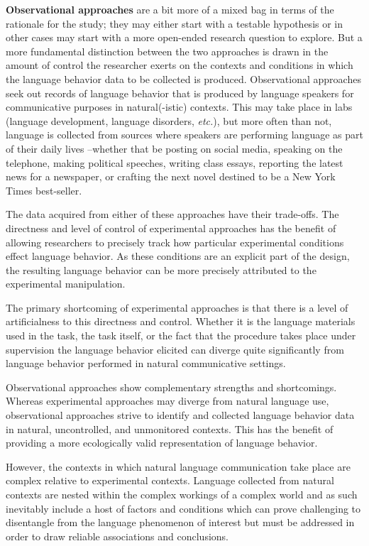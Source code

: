 \documentclass[
  letterpaper,
]{book}
\theoremstyle{definition}
\theoremstyle{remark}
\begin{document}
\textbf{Observational approaches} are a bit more of a mixed bag in terms
of the rationale for the study; they may either start with a testable
hypothesis or in other cases may start with a more open-ended research
question to explore. But a more fundamental distinction between the two
approaches is drawn in the amount of control the researcher exerts on
the contexts and conditions in which the language behavior data to be
collected is produced. Observational approaches seek out records of
language behavior that is produced by language speakers for
communicative purposes in natural(-istic) contexts. This may take place
in labs (language development, language disorders, \emph{etc.}), but
more often than not, language is collected from sources where speakers
are performing language as part of their daily lives --whether that be
posting on social media, speaking on the telephone, making political
speeches, writing class essays, reporting the latest news for a
newspaper, or crafting the next novel destined to be a New York Times
best-seller.

The data acquired from either of these approaches have their trade-offs.
The directness and level of control of experimental approaches has the
benefit of allowing researchers to precisely track how particular
experimental conditions effect language behavior. As these conditions
are an explicit part of the design, the resulting language behavior can
be more precisely attributed to the experimental manipulation.

The primary shortcoming of experimental approaches is that there is a
level of artificialness to this directness and control. Whether it is
the language materials used in the task, the task itself, or the fact
that the procedure takes place under supervision the language behavior
elicited can diverge quite significantly from language behavior
performed in natural communicative settings.

Observational approaches show complementary strengths and shortcomings.
Whereas experimental approaches may diverge from natural language use,
observational approaches strive to identify and collected language
behavior data in natural, uncontrolled, and unmonitored contexts. This
has the benefit of providing a more ecologically valid representation of
language behavior.

However, the contexts in which natural language communication take place
are complex relative to experimental contexts. Language collected from
natural contexts are nested within the complex workings of a complex
world and as such inevitably include a host of factors and conditions
which can prove challenging to disentangle from the language phenomenon
of interest but must be addressed in order to draw reliable associations
and conclusions.
\end{document}
